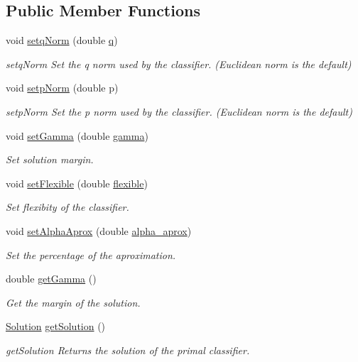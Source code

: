\subsection*{Public Member Functions}
\begin{DoxyCompactItemize}
\item 
void \hyperlink{class_primal_classifier_a22ca554e2a8d33d43c813b6b9b3e4a6a}{setq\+Norm} (double \hyperlink{class_primal_classifier_a746ad2ff93fb77d82ae389f90dbdc89e}{q})
\begin{DoxyCompactList}\small\item\em setq\+Norm Set the q norm used by the classifier. (Euclidean norm is the default) \end{DoxyCompactList}\item 
void \hyperlink{class_primal_classifier_a30cd3926ea5e7341920dcb5480567af1}{setp\+Norm} (double p)
\begin{DoxyCompactList}\small\item\em setp\+Norm Set the p norm used by the classifier. (Euclidean norm is the default) \end{DoxyCompactList}\item 
void \hyperlink{class_primal_classifier_a2d1443916a530c9b3729fb748097db50}{set\+Gamma} (double \hyperlink{class_primal_classifier_ab8c6099dda1468385b2c401cb65c1238}{gamma})
\begin{DoxyCompactList}\small\item\em Set solution margin. \end{DoxyCompactList}\item 
void \hyperlink{class_primal_classifier_acf3edea17de00a41c33d0fee4fabd4da}{set\+Flexible} (double \hyperlink{class_primal_classifier_af660bbc42f67792e3da8876671b1e9df}{flexible})
\begin{DoxyCompactList}\small\item\em Set flexibity of the classifier. \end{DoxyCompactList}\item 
void \hyperlink{class_primal_classifier_a49be3fca8d8383d98f9d671d1e1f27c7}{set\+Alpha\+Aprox} (double \hyperlink{class_primal_classifier_a1a432d06373100e176e116f995bdcd26}{alpha\+\_\+aprox})
\begin{DoxyCompactList}\small\item\em Set the percentage of the aproximation. \end{DoxyCompactList}\item 
double \hyperlink{class_primal_classifier_a320c67c29eeb85d5d05f7db1de7fde41}{get\+Gamma} ()
\begin{DoxyCompactList}\small\item\em Get the margin of the solution. \end{DoxyCompactList}\item 
\hyperlink{class_solution}{Solution} \hyperlink{class_primal_classifier_a1a3d9ba4e80c58418db0d8454168b910}{get\+Solution} ()
\begin{DoxyCompactList}\small\item\em get\+Solution Returns the solution of the primal classifier. \end{DoxyCompactList}\end{DoxyCompactItemize}
